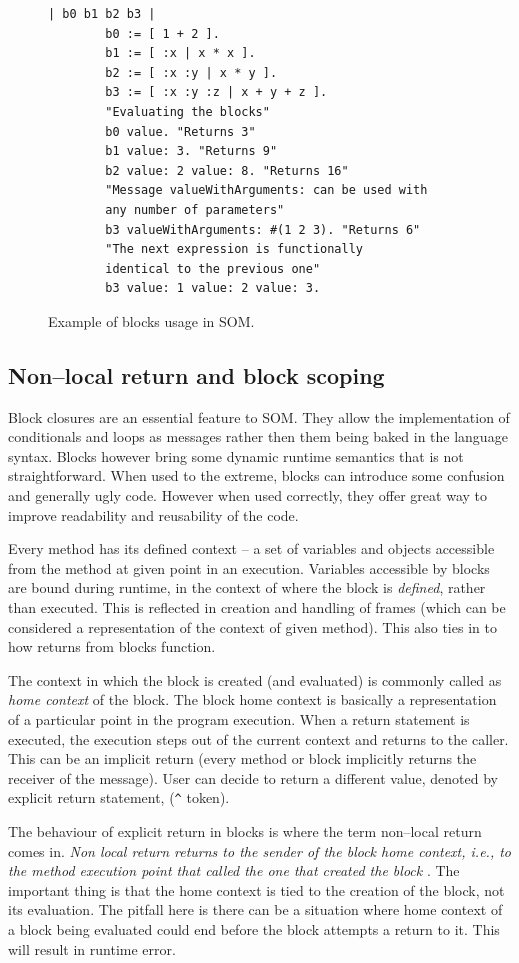 \documentclass[thesis=M,english]{FITthesis}[2019/12/23]
\begin{document}
\begin{figure}[h!]
	\caption{Example of blocks usage in SOM.}
	\begin{lstlisting}[language=Smalltalk]
		| b0 b1 b2 b3 |
		b0 := [ 1 + 2 ].
		b1 := [ :x | x * x ].
		b2 := [ :x :y | x * y ].
		b3 := [ :x :y :z | x + y + z ].
		"Evaluating the blocks"
		b0 value. "Returns 3"
		b1 value: 3. "Returns 9"
		b2 value: 2 value: 8. "Returns 16"
		"Message valueWithArguments: can be used with 
		any number of parameters"
		b3 valueWithArguments: #(1 2 3). "Returns 6"
		"The next expression is functionally 
		identical to the previous one"
		b3 value: 1 value: 2 value: 3.
	\end{lstlisting}
\end{figure}

\subsection{Non--local return and block scoping}
\label{subsection:nlret}
Block closures are an essential feature to SOM. They allow the implementation of conditionals and loops as messages
rather then them being baked in the language syntax. Blocks however bring some dynamic runtime semantics that is not
straightforward. When used to the extreme, blocks can introduce some confusion and generally ugly code. However when
used correctly, they offer great way to improve readability and reusability of the code.

Every method has its defined context -- a set of variables and objects accessible from the method at given point in an
execution. Variables accessible by blocks are bound during runtime, in the context of where the block is \textit{defined},
rather than executed. This is reflected in creation and handling of frames (which can be considered a representation of
the context of given method). This also ties in to how returns from blocks function.

The context in which the block is created (and evaluated) is commonly called as \textit{home context} of the block.
The block home context is basically a representation of a particular point in the program execution. When a return
statement is executed, the execution steps out of the current context and returns to the caller. This can be
an implicit return (every method or block implicitly returns the receiver of the message). User can decide to
return a different value, denoted by explicit return statement, (\texttt{\^} token).

The behaviour of explicit return in blocks is where the term non--local return comes in. \textit{Non local return returns
to the sender of the block home context, i.e., to the method execution point that called the one that created the block}
\cite{pharo-blocks}. The important thing is that the home context is tied to the creation of the block, not its
evaluation. The pitfall here is there can be a situation where home context of a block being evaluated could end before
the block attempts a return to it. This will result in runtime error.
\end{document}
